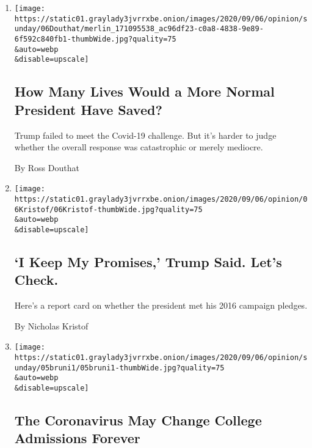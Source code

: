\begin{enumerate}
\def\labelenumi{\arabic{enumi}.}
\item
  \href{/2020/09/05/opinion/sunday/covid-19-trump.html}{}

  \texttt{[image: https://static01.graylady3jvrrxbe.onion/images/2020/09/06/opinion/sunday/06Douthat/merlin\_171095538\_ac96df23-c0a8-4838-9e89-6f592c840fb1-thumbWide.jpg?quality=75\\\&auto=webp\\\&disable=upscale]}

  \hypertarget{how-many-lives-would-a-more-normal-president-have-saved}{%
  \subsection{How Many Lives Would a More Normal President Have
  Saved?}\label{how-many-lives-would-a-more-normal-president-have-saved}}

  Trump failed to meet the Covid-19 challenge. But it's harder to judge
  whether the overall response was catastrophic or merely mediocre.

  By Ross Douthat
\item
  \href{/2020/09/05/opinion/sunday/trump-promises-check.html}{}

  \texttt{[image: https://static01.graylady3jvrrxbe.onion/images/2020/09/06/opinion/06Kristof/06Kristof-thumbWide.jpg?quality=75\\\&auto=webp\\\&disable=upscale]}

  \hypertarget{i-keep-my-promises-trump-said-lets-check}{%
  \subsection{`I Keep My Promises,' Trump Said. Let's
  Check.}\label{i-keep-my-promises-trump-said-lets-check}}

  Here's a report card on whether the president met his 2016 campaign
  pledges.

  By Nicholas Kristof
\item
  \href{/2020/09/05/opinion/sunday/coronavirus-college-admissions.html}{}

  \texttt{[image: https://static01.graylady3jvrrxbe.onion/images/2020/09/06/opinion/sunday/05bruni1/05bruni1-thumbWide.jpg?quality=75\\\&auto=webp\\\&disable=upscale]}

  \hypertarget{the-coronavirus-may-change-college-admissions-forever}{%
  \subsection{The Coronavirus May Change College Admissions
  Forever}\label{the-coronavirus-may-change-college-admissions-forever}}


\end{enumerate}
